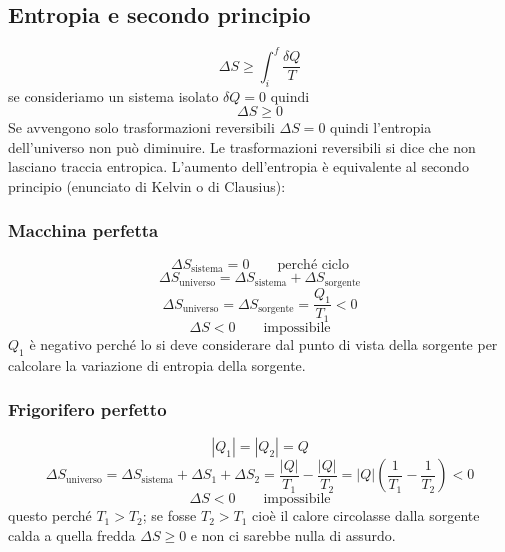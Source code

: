 \subsection{Entropia e secondo principio}
\begin{equation*}\Delta S\geq\int_i^f\frac{\delta Q}{T}\end{equation*}
se consideriamo un sistema isolato $\delta Q=0$ quindi
\begin{equation*}\Delta S\geq 0\end{equation*}
Se avvengono solo trasformazioni reversibili $\Delta S=0$ quindi l'entropia dell'universo non può diminuire. Le trasformazioni reversibili si dice che non lasciano traccia entropica. L'aumento dell'entropia è equivalente al secondo principio (enunciato di Kelvin o di Clausius):
\subsubsection{Macchina perfetta}

\begin{equation*}\Delta S_\text{sistema}=0 \qquad\text{perché ciclo}\end{equation*}
\begin{equation*}\Delta S_\text{universo}=\Delta S_\text{sistema}+\Delta S_\text{sorgente}\end{equation*}
\begin{equation*}\Delta S_\text{universo}=\Delta S_\text{sorgente}=\frac{Q_1}{T_1}<0\end{equation*}
\begin{equation*}\Delta S<0\qquad \text{impossibile}\end{equation*}
$Q_1$ è negativo perché lo si deve considerare dal punto di vista della sorgente per calcolare la variazione di entropia della sorgente.

\subsubsection{Frigorifero perfetto}


\begin{equation*}|Q_1|=|Q_2|=Q\end{equation*}
\begin{equation*}\Delta S_\text{universo}=\Delta S_\text{sistema}+\Delta S_1+\Delta S_2=\frac{|Q|}{T_1}-\frac{|Q|}{T_2}=|Q|\left(\frac{1}{T_1}-\frac{1}{T_2}\right)<0\end{equation*}
\begin{equation*}\Delta S<0\qquad \text{impossibile}\end{equation*}
questo perché $T_1>T_2$; se fosse $T_2>T_1$ cioè il calore circolasse dalla sorgente calda a quella fredda $\Delta S\geq 0$ e non ci sarebbe nulla di assurdo.

